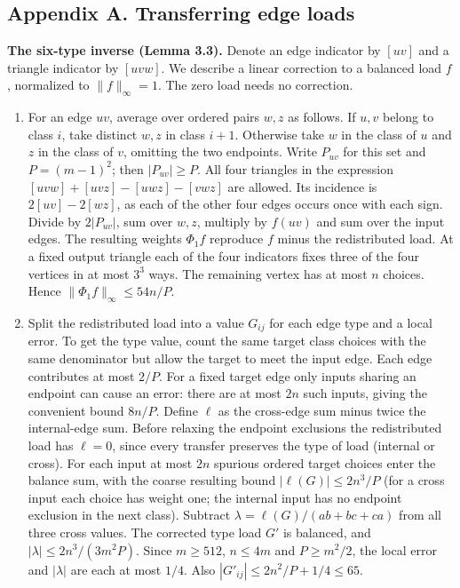 \documentclass[english,11pt,a4paper]{article}
\providecommand{\tightlist}{\setlength{\itemsep}{0pt}\setlength{\parskip}{0pt}}
\begin{document}
\subsection{Appendix A. Transferring edge loads}\label{appendix-a.-transferring-edge-loads}

\textbf{The six-type inverse (Lemma 3.3).} Denote an edge indicator by \([uv]\) and a triangle indicator by \([uvw]\). We describe a linear correction to a balanced load \(f\), normalized to \(\|f\|_\infty=1\). The zero load needs no correction.

\begin{enumerate}
\def\labelenumi{\arabic{enumi}.}
\tightlist
\item
  For an edge \(uv\), average over ordered pairs \(w,z\) as follows. If \(u,v\) belong to class \(i\), take distinct \(w,z\) in class \(i+1\). Otherwise take \(w\) in the class of \(u\) and \(z\) in the class of \(v\), omitting the two endpoints. Write \(P_{uv}\) for this set and \(P=(m-1)^2\); then \(|P_{uv}|\ge P\). All four triangles in the expression \([uvw]+[uvz]-[uwz]-[vwz]\) are allowed. Its incidence is \(2[uv]-2[wz]\), as each of the other four edges occurs once with each sign. Divide by \(2|P_{uv}|\), sum over \(w,z\), multiply by \(f(uv)\) and sum over the input edges. The resulting weights \(\Phi_1 f\) reproduce \(f\) minus the redistributed load. At a fixed output triangle each of the four indicators fixes three of the four vertices in at most \(3^3\) ways. The remaining vertex has at most \(n\) choices. Hence \(\|\Phi_1 f\|_\infty\le54n/P\).
\item
  Split the redistributed load into a value \(G_{ij}\) for each edge type and a local error. To get the type value, count the same target class choices with the same denominator but allow the target to meet the input edge. Each edge contributes at most \(2/P\). For a fixed target edge only inputs sharing an endpoint can cause an error: there are at most \(2n\) such inputs, giving the convenient bound \(8n/P\). Define \(\ell\) as the cross-edge sum minus twice the internal-edge sum. Before relaxing the endpoint exclusions the redistributed load has \(\ell=0\), since every transfer preserves the type of load (internal or cross). For each input at most \(2n\) spurious ordered target choices enter the balance sum, with the coarse resulting bound \(|\ell(G)|\le 2n^3/P\) (for a cross input each choice has weight one; the internal input has no endpoint exclusion in the next class). Subtract \(\lambda=\ell(G)/(ab+bc+ca)\) from all three cross values. The corrected type load \(G'\) is balanced, and \(|\lambda|\le2n^3/(3m^2P)\). Since \(m\ge512\), \(n\le4m\) and \(P\ge m^2/2\), the local error and \(|\lambda|\) are each at most \(1/4\). Also \(|G'_{ij}|\le2n^2/P+1/4\le65\).

\end{enumerate}
\end{document}
